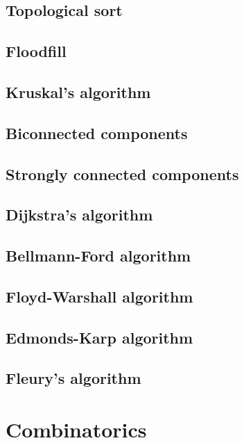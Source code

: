 \documentclass[a4paper]{article}
\begin{document}
    \subsection{Topological sort}
    
    \subsection{Floodfill}
    
    \subsection{Kruskal's algorithm}
    
    \subsection{Biconnected components}
    
    \subsection{Strongly connected components}
    
    \subsection{Dijkstra's algorithm}
    
    \subsection{Bellmann-Ford algorithm}
    
    \subsection{Floyd-Warshall algorithm}
    
    \subsection{Edmonds-Karp algorithm}
    
    \subsection{Fleury's algorithm}
    
  \section{Combinatorics}
  
\end{document}
